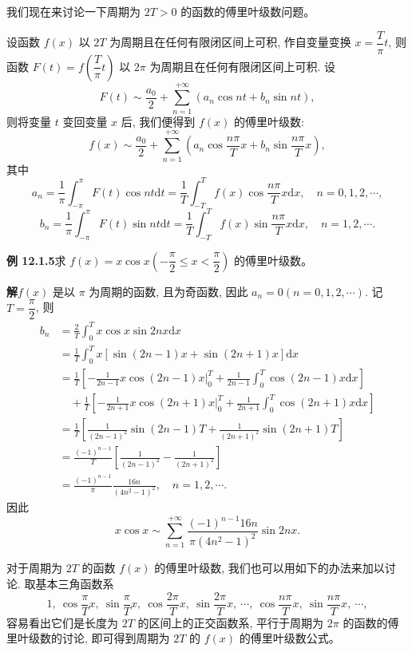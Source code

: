 \documentclass[UTF8, 12pt, fontset=fandol, oneside]{ctexart}
\begin{document}
我们现在来讨论一下周期为 $2T>0$ 的函数的傅里叶级数问题。

设函数 $f(x)$ 以 $2T$ 为周期且在任何有限闭区间上可积, 作自变量变换 $x=\dfrac{T}{\pi}t$, 则函数 $F(t)=f\left(\dfrac{T}{\pi}t\right)$ 以 $2\pi$ 为周期且在任何有限闭区间上可积. 设
\[
  F(t)\sim\frac{a_0}{2}+\sum_{n=1}^{+\infty}(a_n\cos nt+b_n\sin nt),
\]
则将变量 $t$ 变回变量 $x$ 后, 我们便得到 $f(x)$ 的傅里叶级数:
\[
  f(x)\sim\frac{a_0}{2}
  +\sum_{n=1}^{+\infty}\left(a_n\cos\frac{n\pi}{T}x+b_n\sin\frac{n\pi}{T}x\right),
\]
其中
\[
  a_n=\frac1\pi\int_{-\pi}^{\pi}F(t)\cos nt\mathrm dt
  =\frac1T\int_{-T}^{T}f(x)\cos\frac{n\pi}{T}x\mathrm dx,\quad n=0,1,2,\cdots,
\]
\[
  b_n=\frac1\pi\int_{-\pi}^{\pi}F(t)\sin nt\mathrm dt
  =\frac1T\int_{-T}^{T}f(x)\sin\frac{n\pi}{T}x\mathrm dx,\quad n=1,2,\cdots.
\]

\noindent\textbf{例 12.1.5}\quad 求 $f(x)=x\cos x\left(-\dfrac{\pi}{2}\leqslant x<\dfrac{\pi}{2}\right)$ 的傅里叶级数。

\noindent\textbf{解}\quad $f(x)$ 是以 $\pi$ 为周期的函数, 且为奇函数, 因此 $a_n=0(n=0,1,2,\cdots)$. 记 $T=\dfrac{\pi}{2}$, 则
\[
\begin{aligned}
  b_n
  &=\frac2T\int_0^T x\cos x\sin 2nx\mathrm dx\\
  &=\frac1T\int_0^T x[\sin(2n-1)x+\sin(2n+1)x]\mathrm dx\\
  &=\frac1T\left[-\frac1{2n-1}x\cos(2n-1)x\bigg|_0^T
    +\frac1{2n-1}\int_0^T\cos(2n-1)x\mathrm dx\right]\\
  &\quad+\frac1T\left[-\frac1{2n+1}x\cos(2n+1)x\bigg|_0^T
    +\frac1{2n+1}\int_0^T\cos(2n+1)x\mathrm dx\right]\\
  &=\frac1T\left[\frac1{(2n-1)^2}\sin(2n-1)T
    +\frac1{(2n+1)^2}\sin(2n+1)T\right]\\
  &=\frac{(-1)^{n-1}}{T}\left[\frac1{(2n-1)^2}-\frac1{(2n+1)^2}\right]\\
  &=\frac{(-1)^{n-1}}{\pi}\frac{16n}{(4n^2-1)^2},\quad n=1,2,\cdots.
\end{aligned}
\]
因此
\[
  x\cos x\sim
  \sum_{n=1}^{+\infty}\frac{(-1)^{n-1}16n}{\pi(4n^2-1)^2}\sin 2nx.
\]

对于周期为 $2T$ 的函数 $f(x)$ 的傅里叶级数, 我们也可以用如下的办法来加以讨论. 取基本三角函数系
\[
  1,\ \cos\frac{\pi}{T}x,\ \sin\frac{\pi}{T}x,\ \cos\frac{2\pi}{T}x,\ \sin\frac{2\pi}{T}x,\ \cdots,\ 
  \cos\frac{n\pi}{T}x,\ \sin\frac{n\pi}{T}x,\ \cdots,
\]
容易看出它们是长度为 $2T$ 的区间上的正交函数系, 平行于周期为 $2\pi$ 的函数的傅里叶级数的讨论, 即可得到周期为 $2T$ 的 $f(x)$ 的傅里叶级数公式。
\end{document}
